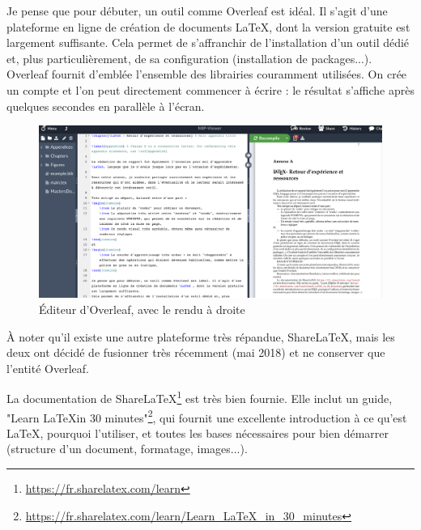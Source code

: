 Je pense que pour débuter, un outil comme Overleaf est idéal. Il s'agit d'une plateforme en ligne de création de documents \LaTeX , dont la version gratuite est largement suffisante.
Cela permet de s'affranchir de l'installation d'un outil dédié et, plus particulièrement, de sa configuration (installation de packages...). Overleaf fournit d'emblée l'ensemble des librairies couramment utilisées.
On crée un compte et l'on peut directement commencer à écrire : le résultat s'affiche après quelques secondes en parallèle à l'écran.

\begin{figure}
    \centering
    \includegraphics[width=\linewidth]{Figures/overleaf-editor.png}
    \caption{Éditeur d'Overleaf, avec le rendu à droite}
    \label{fig:overleaf-editor}
\end{figure}

À noter qu'il existe une autre plateforme très répandue, ShareLaTeX, mais les deux ont décidé de fusionner très récemment (mai 2018) et ne conserver que l'entité Overleaf.



La documentation de ShareLaTeX\footnote{\url{https://fr.sharelatex.com/learn}} est très bien fournie. Elle inclut un guide, "Learn \LaTeX in 30 minutes"\footnote{\url{https://fr.sharelatex.com/learn/Learn_LaTeX_in_30_minutes}}, qui fournit une excellente introduction à ce qu'est \LaTeX, pourquoi l'utiliser, et toutes les bases nécessaires pour bien démarrer (structure d'un document, formatage, images...).
